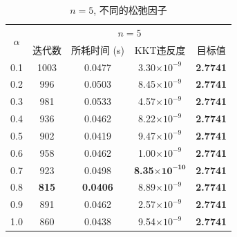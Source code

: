 \documentclass[UTF8,10.5pt,a4paper]{ctexart}
\theoremstyle{definition}
\theoremstyle{definition}
\begin{document}
\begin{table}[htbp]
	\renewcommand{\captionfont}{\small}
    \centering
    \caption{$n=5$, 不同的松弛因子}
    \label{n5alpha}
    \vskip 4mm
    \begin{tabular}{c|c|c|c|c}
        \hline
        \multirow{2}{*}{$\alpha$} & \multicolumn{4}{c}{$n=5$}\\\cline{2-5}
          & 迭代数 & 所耗时间 (s) & KKT违反度 & 目标值\\\hline
        0.1 & 1003 & 0.0477 & 3.30$\times10^{-9}$ &\textbf{2.7741} \\\hline
        0.2 & 996 & 0.0503 & 8.45$\times10^{-9}$ & \textbf{2.7741} \\\hline
        0.3 & 981 & 0.0533 & 4.57$\times10^{-9}$ & \textbf{2.7741} \\\hline
        0.4 & 936 & 0.0462 & 8.22$\times10^{-9}$ & \textbf{2.7741} \\\hline
        0.5 & 902 & 0.0419 & 9.47$\times10^{-9}$ & \textbf{2.7741} \\\hline
        0.6 & 958 & 0.0462 & 1.00$\times10^{-9}$ & \textbf{2.7741} \\\hline
        0.7 & 923 & 0.0498 & \textbf{8.35$\mathbf{\times10^{-10}}$} & \textbf{2.7741} \\\hline
        0.8 & \textbf{815} & \textbf{0.0406} & 8.89$\times10^{-9}$ & \textbf{2.7741} \\\hline
        0.9 & 891 & 0.0462 & 2.57$\times10^{-9}$ & \textbf{2.7741} \\\hline
        1.0 & 860 & 0.0438 & 9.54$\times10^{-9}$ & \textbf{2.7741} \\\hline
    \end{tabular}
\end{table}
\end{document}
